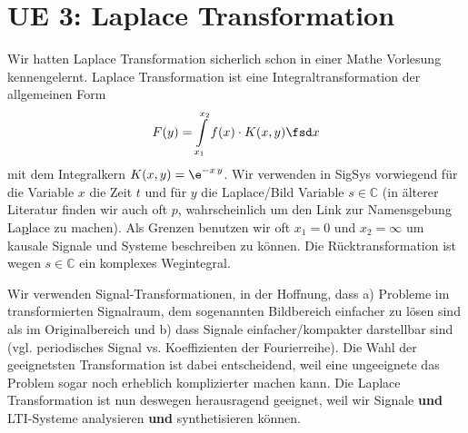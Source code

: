 \clearpage
\section{UE 3: Laplace Transformation}
%
Wir hatten Laplace Transformation sicherlich schon in einer Mathe Vorlesung
kennengelernt.
Laplace Transformation ist eine Integraltransformation der allgemeinen Form
\begin{equation}
F(y) = \int\limits_{x_1}^{x_2} f(x) \cdot K(x,y) \fsd x
\end{equation}
mit dem Integralkern $K(x,y) = \e^{-x\,y}$.
Wir verwenden in SigSys vorwiegend für die Variable $x$ die Zeit $t$ und für
$y$ die Laplace/Bild Variable $s\in\mathbb{C}$ (in älterer Literatur finden
wir auch oft $p$, wahrscheinlich um den Link zur Namensgebung La\underline{p}lace
zu machen).
Als Grenzen benutzen wir oft $x_1=0$ und $x_2=\infty$ um kausale Signale und
Systeme beschreiben zu können.
%
Die Rücktransformation ist wegen $s\in\mathbb{C}$ ein komplexes Wegintegral.

Wir verwenden Signal-Transformationen, in der Hoffnung, dass a) Probleme im
transformierten Signalraum, dem sogenannten Bildbereich einfacher zu lösen
sind als im Originalbereich und b) dass Signale einfacher/kompakter darstellbar
sind (vgl. periodisches Signal vs. Koeffizienten der Fourierreihe).
%
Die Wahl der geeignetsten Transformation ist dabei entscheidend, weil eine
ungeeignete das Problem sogar noch erheblich komplizierter machen kann.
%
Die Laplace Transformation ist nun deswegen herausragend geeignet, weil
wir Signale \textbf{und} LTI-Systeme analysieren \textbf{und} synthetisieren
können.

